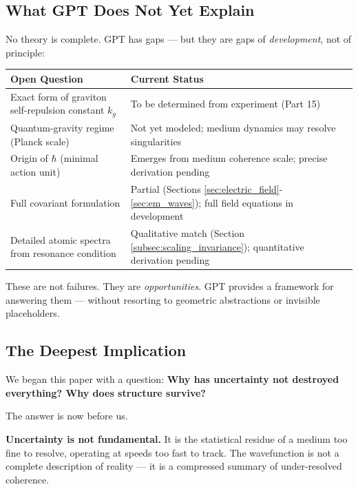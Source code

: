\documentclass[12pt, a4paper]{article}
\begin{document}
\subsection{What GPT Does Not Yet Explain}
\label{subsec:gpt_gaps}

No theory is complete. GPT has gaps — but they are gaps of \textit{development}, not of principle:

\begin{center}
\begin{tabular}{|p{5cm}|p{9cm}|}
\hline
\textbf{Open Question} & \textbf{Current Status} \\
\hline
Exact form of graviton self-repulsion constant \( k_g \) & To be determined from experiment (Part 15) \\
\hline
Quantum-gravity regime (Planck scale) & Not yet modeled; medium dynamics may resolve singularities \\
\hline
Origin of \( \hbar \) (minimal action unit) & Emerges from medium coherence scale; precise derivation pending \\
\hline
Full covariant formulation & Partial (Sections \ref{sec:electric_field}-\ref{sec:em_waves}); full field equations in development \\
\hline
Detailed atomic spectra from resonance condition & Qualitative match (Section \ref{subsec:scaling_invariance}); quantitative derivation pending \\
\hline
\end{tabular}
\end{center}

These are not failures. They are \textit{opportunities}. GPT provides a framework for answering them — without resorting to geometric abstractions or invisible placeholders.

\subsection{The Deepest Implication}
\label{subsec:deepest_implication}

We began this paper with a question: \textbf{Why has uncertainty not destroyed everything? Why does structure survive?}

The answer is now before us.

\textbf{Uncertainty is not fundamental.} It is the statistical residue of a medium too fine to resolve, operating at speeds too fast to track. The wavefunction is not a complete description of reality — it is a compressed summary of under-resolved coherence.
\end{document}
